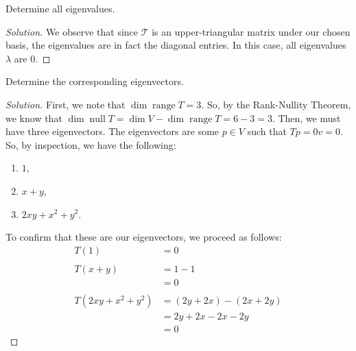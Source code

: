\documentclass{article}
\newenvironment{solution}{\begin{proof}[Solution]}{\end{proof}}
\DeclareMathOperator*{\vnull}{\mathrm{null}}
\DeclareMathOperator*{\vrange}{\mathrm{range}}
\begin{document}
	\begin{hw}
		Determine all eigenvalues.
	\end{hw}
	\begin{solution}
		We observe that since $\mathcal{T}$ is an upper-triangular matrix under our chosen basis, the eigenvalues are in fact the diagonal entries. In this case, all eigenvalues $\lambda$ are $0$.
	\end{solution}

	\begin{hw}
		Determine the corresponding eigenvectors.
	\end{hw}
	\begin{solution}
		First, we note that $\dim \vrange T = 3$. So, by the Rank-Nullity Theorem, we know that $\dim \vnull T = \dim V - \dim \vrange T = 6 - 3 = 3$. Then, we must have three eigenvectors. The eigenvectors are some $p \in V$ such that $Tp = 0v = 0$. So, by inspection, we have the following:
		\begin{enumerate}
			\item $1$,
			\item $x+y$,
			\item $2xy + x^{2} + y^{2}$.
		\end{enumerate}
	
		To confirm that these are our eigenvectors, we proceed as follows:
		\begin{align*}
			T(1) &= 0 \\
			\\
			T(x+y) &= 1 - 1 \\
			&= 0 \\
			\\
			T(2xy +x^{2} + y^{2}) &= (2y + 2x) - (2x + 2y) \\
			&= 2y + 2x - 2x - 2y \\
			&= 0
		\end{align*}
	\end{solution}

	\newpage
	
\end{document}
